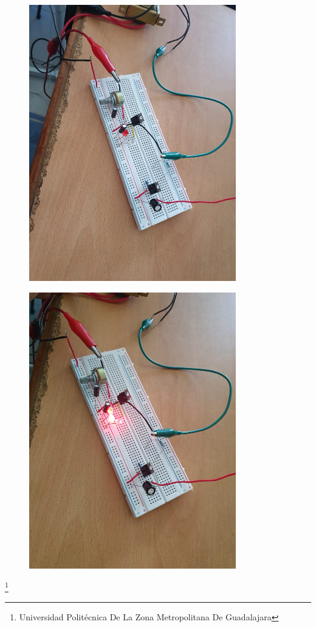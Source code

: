 \documentclass[11pt,a4paper]{article}
\begin{document}
\begin{figure}[hbtp]
\centering
\includegraphics[scale=0.50]{6.png}
\end{figure}
\begin{figure}[hbtp]
\centering
\includegraphics[scale=0.50]{7.png}
\end{figure}

\footnote{Universidad Politécnica De La Zona Metropolitana De Guadalajara} 
\end{document}
